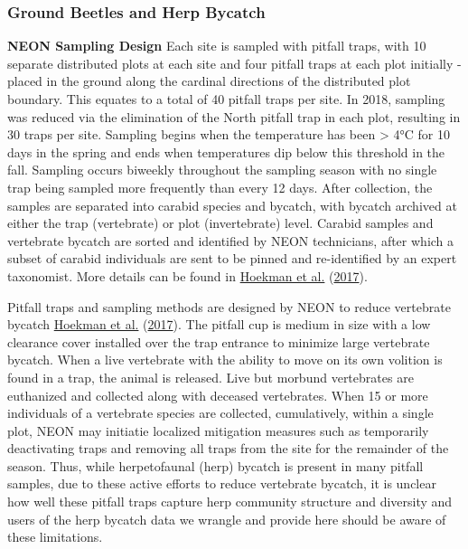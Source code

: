 \documentclass[
  12pt,
]{article}
\begin{document}
\hypertarget{ground-beetles-and-herp-bycatch}{%
\subsubsection{Ground Beetles and Herp Bycatch}\label{ground-beetles-and-herp-bycatch}}

\textbf{NEON Sampling Design} Each site is sampled with pitfall traps, with 10 separate distributed plots at each site and four pitfall traps at each plot initially - placed in the ground along the cardinal directions of the distributed plot boundary. This equates to a total of 40 pitfall traps per site. In 2018, sampling was reduced via the elimination of the North pitfall trap in each plot, resulting in 30 traps per site. Sampling begins when the temperature has been \textgreater{} 4°C for 10 days in the spring and ends when temperatures dip below this threshold in the fall. Sampling occurs biweekly throughout the sampling season with no single trap being sampled more frequently than every 12 days. After collection, the samples are separated into carabid species and bycatch, with bycatch archived at either the trap (vertebrate) or plot (invertebrate) level. Carabid samples and vertebrate bycatch are sorted and identified by NEON technicians, after which a subset of carabid individuals are sent to be pinned and re-identified by an expert taxonomist. More details can be found in \protect\hyperlink{ref-hoekman2017design}{Hoekman et al.} (\protect\hyperlink{ref-hoekman2017design}{2017}).

Pitfall traps and sampling methods are designed by NEON to reduce vertebrate bycatch \protect\hyperlink{ref-hoekman2017design}{Hoekman et al.} (\protect\hyperlink{ref-hoekman2017design}{2017}). The pitfall cup is medium in size with a low clearance cover installed over the trap entrance to minimize large vertebrate bycatch. When a live vertebrate with the ability to move on its own volition is found in a trap, the animal is released. Live but morbund vertebrates are euthanized and collected along with deceased vertebrates. When 15 or more individuals of a vertebrate species are collected, cumulatively, within a single plot, NEON may initiatie localized mitigation measures such as temporarily deactivating traps and removing all traps from the site for the remainder of the season. Thus, while herpetofaunal (herp) bycatch is present in many pitfall samples, due to these active efforts to reduce vertebrate bycatch, it is unclear how well these pitfall traps capture herp community structure and diversity and users of the herp bycatch data we wrangle and provide here should be aware of these limitations.
\end{document}
